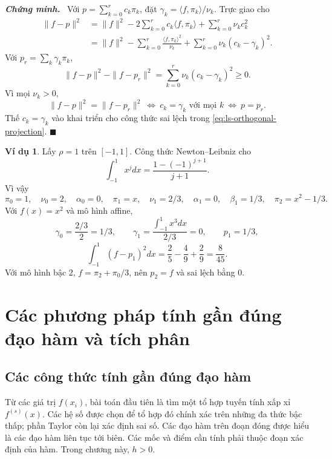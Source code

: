 \documentclass[12pt,a4paper,oneside]{book}
\numberwithin{algorithm}{chapter}
\theoremstyle{definition}
\newtheorem{vidu}{Ví dụ}[chapter]
\newenvironment{chungminh}{\par\medskip\noindent\textbf{\textit{\color{mainblue}Chứng minh.}}\ }{\hfill$\blacksquare$\par\medskip}
\begin{document}
\begin{chungminh}
Với $p=\sum_{k=0}^rc_k\pi_k$, đặt $\gamma_k=\langle f,\pi_k\rangle/\nu_k$. Trực giao cho
\begin{align*}
 \|f-p\|^2
 &=\|f\|^2-2\sum_{k=0}^rc_k\langle f,\pi_k\rangle+\sum_{k=0}^r\nu_kc_k^2\\
 &=\|f\|^2-\sum_{k=0}^r\frac{\langle f,\pi_k\rangle^2}{\nu_k}
   +\sum_{k=0}^r\nu_k(c_k-\gamma_k)^2.
\end{align*}
Với $p_r=\sum_k\gamma_k\pi_k$,
\[
 \|f-p\|^2-\|f-p_r\|^2
 =\sum_{k=0}^r\nu_k(c_k-\gamma_k)^2\geq0.
\]
Vì mọi $\nu_k>0$,
\[
 \|f-p\|^2=\|f-p_r\|^2
 \ \Longleftrightarrow\ c_k=\gamma_k\text{ với mọi }k
 \ \Longleftrightarrow\ p=p_r.
\]
Thế $c_k=\gamma_k$ vào khai triển cho công thức sai lệch trong \eqref{eq:ls-orthogonal-projection}.
\end{chungminh}
\begin{vidu}
Lấy $\rho=1$ trên $[-1,1]$. Công thức Newton--Leibniz cho
\[
 \int_{-1}^1x^jdx=\frac{1-(-1)^{j+1}}{j+1}.
\]
Vì vậy
\[
 \pi_0=1,\quad\nu_0=2,\quad\alpha_0=0,\quad\pi_1=x,\quad
 \nu_1=2/3,\quad\alpha_1=0,\quad\beta_1=1/3,\quad\pi_2=x^2-1/3.
\]
Với $f(x)=x^2$ và mô hình affine,
\[
 \gamma_0=\frac{2/3}2=1/3,\qquad\gamma_1=\frac{\int_{-1}^1x^3dx}{2/3}=0,\qquad p_1=1/3,
\]
\[
 \int_{-1}^1(f-p_1)^2dx=\frac25-\frac49+\frac29=\frac8{45}.
\]
Với mô hình bậc $2$, $f=\pi_2+\pi_0/3$, nên $p_2=f$ và sai lệch bằng $0$.
\end{vidu}




\chapter{Các phương pháp tính gần đúng đạo hàm và tích phân}
\label{chap:numerical-calculus}

\section{Các công thức tính gần đúng đạo hàm}
Từ các giá trị $f(x_i)$, bài toán đầu tiên là tìm một tổ hợp tuyến tính xấp xỉ $f^{(s)}(x)$. Các hệ số được chọn để tổ hợp đó chính xác trên những đa thức bậc thấp; phần Taylor còn lại xác định sai số. Các đạo hàm trên đoạn đóng được hiểu là các đạo hàm liên tục tới biên. Các mốc và điểm cần tính phải thuộc đoạn xác định của hàm. Trong chương này, $h>0$.
\end{document}
